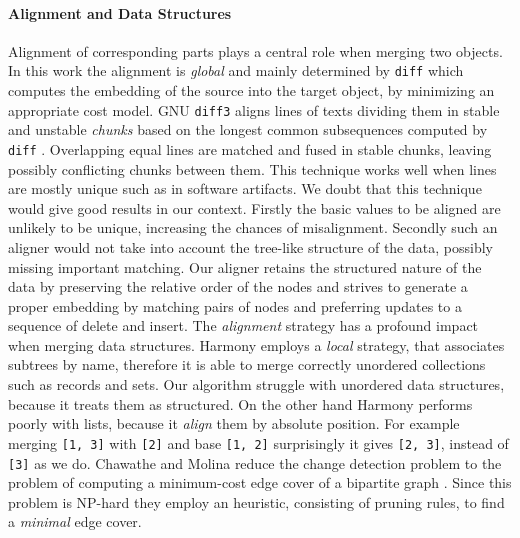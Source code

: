 \documentclass{sigplanconf}
\theoremstyle{plain}
\begin{document}
\paragraph{Alignment and Data Structures} 
Alignment of corresponding parts plays a central role when merging
two objects. 
%
In this work the alignment is \emph{global} and mainly determined by
\texttt{diff}  which computes the embedding of the source into the target
object, by minimizing an appropriate cost model.
%
GNU \texttt{diff3} aligns lines of texts dividing them in stable and
unstable \emph{chunks} based on the longest common subsequences
computed by \texttt{diff} \cite{PierceDiff3}.  
%
Overlapping equal lines are matched and fused in stable chunks,
leaving possibly conflicting chunks between them.
%
This technique works well when lines are mostly unique such as in
software artifacts.
%
We doubt that this technique would give good results in our context.
%
Firstly the basic values to be aligned are unlikely to be unique,
increasing the chances of misalignment.
%
Secondly such an aligner would not take into account the tree-like
structure of the data, possibly missing important matching.
%
Our aligner retains the structured nature of the data by preserving
the relative order of the nodes and strives to generate a proper
embedding by matching pairs of nodes and preferring updates
to a sequence of delete and insert.
%
The \emph{alignment} strategy has a profound impact when merging data
structures.
%
Harmony employs a \emph{local} strategy, that associates subtrees by
name, therefore it is able to merge correctly unordered collections
such as records and sets.
%
Our algorithm struggle with unordered data structures, 
because it treats them as structured.
%
On the other hand Harmony performs poorly with lists, because
it \emph{align} them by absolute position.
%
For example merging \texttt{[1, 3]} with \texttt{[2]} and base 
\texttt{[1, 2]} surprisingly it gives \texttt{[2, 3]}, instead of
\texttt{[3]} as we do.
%
Chawathe and Molina reduce the change detection problem to the problem
of computing a minimum-cost edge cover of a bipartite graph
\cite{Chawathe96}.
%
Since this problem is NP-hard they employ an heuristic, consisting of
pruning rules, to find a \emph{minimal} edge cover.
			
\end{document}

